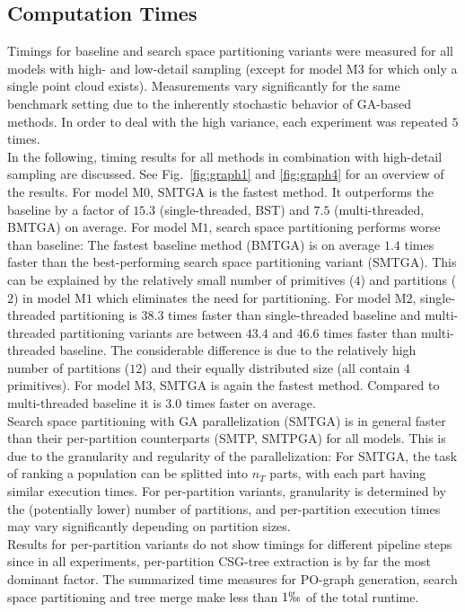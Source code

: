 \subsection{Computation Times}  
Timings for baseline and search space partitioning variants were measured for all models with high- and low-detail sampling (except for model M$3$ for which only a single point cloud exists).
Measurements vary significantly for the same benchmark setting due to the inherently stochastic behavior of \ac{GA}-based methods. 
In order to deal with the high variance, each experiment was repeated $5$ times.
\\
In the following, timing results for all methods in combination with high-detail sampling are discussed.
See Fig.~\ref{fig:graph1} and \ref{fig:graph4} for an overview of the results. 
For model M$0$, SMTGA is the fastest method. 
It outperforms the baseline by a factor of $15.3$ (single-threaded, BST) and $7.5$ (multi-threaded, BMTGA) on average.
For model M$1$, search space partitioning performs worse than baseline: 
The fastest baseline method (BMTGA) is on average $1.4$ times faster than the best-performing search space partitioning variant (SMTGA).
This can be explained by the relatively small number of primitives ($4$) and partitions ($2$) in model M$1$ which eliminates the need for partitioning.
For model M$2$, single-threaded partitioning is $38.3$ times faster than single-threaded baseline and multi-threaded partitioning variants are between $43.4$ and $46.6$ times faster than multi-threaded baseline.  
The considerable difference is due to the relatively high number of partitions ($12$) and their equally distributed size (all contain $4$ primitives).
For model M$3$, SMTGA is again the fastest method. 
Compared to multi-threaded baseline it is $3.0$ times faster on average.
\\
Search space partitioning with \ac{GA} parallelization (SMTGA) is in general faster than their per-partition counterparts (SMTP, SMTPGA) for all models.
This is due to the granularity and regularity of the parallelization: 
For SMTGA, the task of ranking a population can be splitted into $n_T$ parts, with each part having similar execution times.
For per-partition variants, granularity is determined by the (potentially lower) number of partitions, and per-partition execution times may vary significantly depending on partition sizes. 
\\
Results for per-partition variants do not show timings for different pipeline steps since in all experiments, per-partition \ac{CSG}-tree extraction is by far the most dominant factor. 
The summarized time measures for \ac{PO}-graph generation, search space partitioning and tree merge make less than $1\permil$ of the total runtime.
